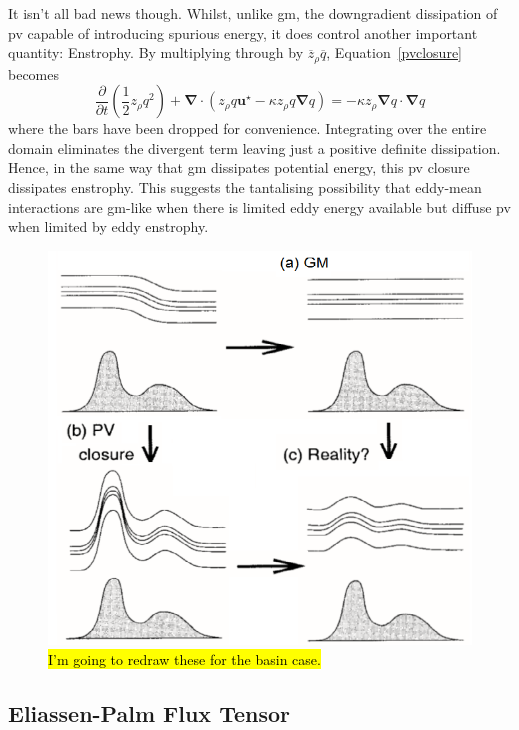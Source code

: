 \documentclass[12pt,a4paper]{report}
\newcommand*\mean[1]{\overline{#1}}
\newcommand*\equref[1]{Equation~\eqref{#1}}
\newcommand*{\half}{\frac{1}{2}}
\begin{document}
                It isn't all bad news though. Whilst, unlike \gls{gm}, the downgradient
                dissipation of \gls{pv} capable of introducing spurious energy, it does
                control another important quantity: Enstrophy. By multiplying through 
                by $\mean{z}_{\rho} \mean{q}$, \equref{pvclosure} becomes 
                \begin{equation}
                \frac{\partial  }{\partial t}\left(\half z_{\rho}q^{2}\right) + \boldsymbol{\nabla}\cdot\left(z_{\rho}q\boldsymbol{u}^\star-\kappa z_{\rho}q\boldsymbol{\nabla} q
                \right)=-\kappa z_\rho \boldsymbol{\nabla}q\cdot\boldsymbol{\nabla}q
                \end{equation}
                where the bars have been dropped for convenience.
                Integrating over the entire domain eliminates the divergent term
                leaving just a positive definite dissipation.
                Hence, in the same way that \gls{gm} dissipates potential energy, this
                \gls{pv} closure dissipates enstrophy. This suggests the tantalising
                possibility that eddy-mean interactions are \gls{gm}-like when
                there is limited eddy energy available but diffuse \gls{pv} when
                limited by eddy enstrophy.
                
                \begin{figure}
                	\centering
                	\includegraphics[width=0.6\linewidth]{am00}
                	\caption[Cold-doming]{\hl{I'm going to redraw these for the basin case.}}
                	\label{fig:Colddoming}
                \end{figure}
                
                
                
                \subsection{Eliassen-Palm Flux Tensor}
                
\end{document}
